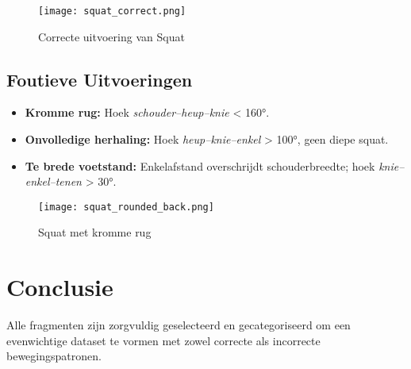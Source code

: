 \begin{figure}[h]
    \centering
    \texttt{[image: squat\_correct.png]}
    \caption{Correcte uitvoering van Squat}
    \label{fig:squat_correct}
\end{figure}

\subsection{Foutieve Uitvoeringen}
\begin{itemize}
    \item \textbf{Kromme rug:} Hoek \textit{schouder–heup–knie} < 160°.
    
    \item \textbf{Onvolledige herhaling:} Hoek \textit{heup–knie–enkel} > 100°, geen diepe squat.
    
    \item \textbf{Te brede voetstand:} Enkelafstand overschrijdt schouderbreedte; hoek \textit{knie–enkel–tenen} > 30°.
\end{itemize}

\begin{figure}[h]
    \centering
    \texttt{[image: squat\_rounded\_back.png]}
    \caption{Squat met kromme rug}
    \label{fig:squat_rounded_back}
\end{figure}

\section{Conclusie}
Alle fragmenten zijn zorgvuldig geselecteerd en gecategoriseerd om een evenwichtige dataset te vormen met zowel correcte als incorrecte bewegingspatronen. 

